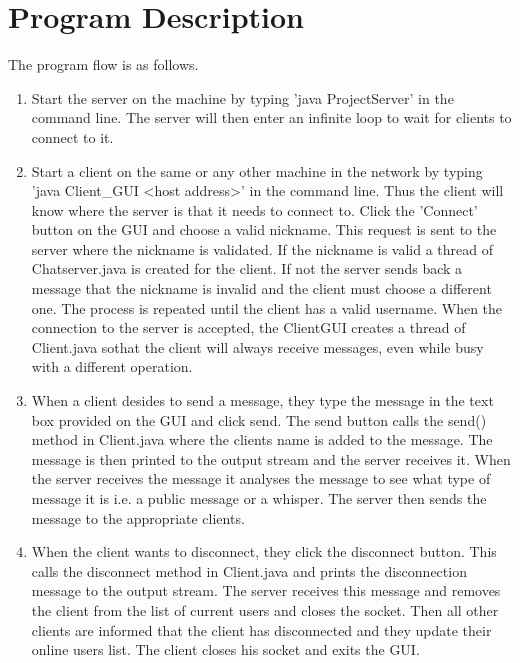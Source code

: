 \documentclass{article}
\begin{document}
\section{Program Description}
The program flow is as follows.
\begin{enumerate}
\item Start the server on the machine by typing 'java ProjectServer' in the command line. 
The server will then enter an infinite loop to wait for clients to connect to it.
\item Start a client on the same or any other machine in the network by typing 'java Client\_GUI \textless host address\textgreater ' 
in the command line. Thus the client will know where the server is that it needs to connect to. Click the 'Connect' 
button on the GUI and choose a valid nickname. This request is sent to the server where the nickname is validated. If the 
nickname is valid a thread of Chatserver.java is created for the client. If not the server sends back a message that the nickname 
is invalid and the client must choose a different one. The process is repeated until the client has a valid username. 
When the connection to the server is accepted, the ClientGUI creates a thread of Client.java sothat the client will always 
receive messages, even while busy with a different operation.
\item When a client desides to send a message, they type the message in the text box provided on the GUI and click send. The send button 
calls the send() method in Client.java where the clients name is added to the message. The message is then printed to the output stream 
and the server receives it. When the server receives the message it analyses the message to see what type of message it is i.e. 
a public message or a whisper. The server then sends the message to the appropriate clients.
\item When the client wants to disconnect, they click the disconnect button. This calls the disconnect method in Client.java and prints 
the disconnection message to the output stream. The server receives this message and removes the client from the list of current users and 
closes the socket. Then all other clients are informed that the client has disconnected and they update their online users list. 
The client closes his socket and exits the GUI.
\end{enumerate}
\end{document}
